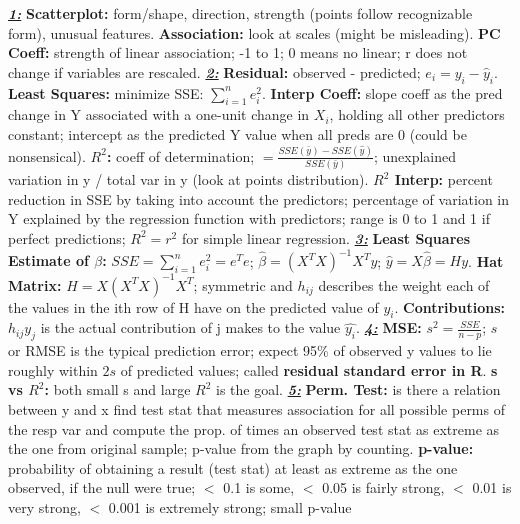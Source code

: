 \documentclass[8pt]{extarticle}
\begin{document}

\textit{\textbf{\underline{1:}}}
\textbf{Scatterplot:} form/shape, direction, strength (points follow 
recognizable form), unusual features.
\textbf{Association:} look at scales (might be misleading).
\textbf{PC Coeff:} strength of linear association; -1 to 1; 0 means no linear; r
does not change if variables are rescaled.
\textit{\textbf{\underline{2:}}}
\textbf{Residual:} observed - predicted; $e_i = y_i - \hat{y}_i$.
\textbf{Least Squares:} minimize SSE: $\sum_{i=1}^{n} e_i^2$.
\textbf{Interp Coeff:} slope coeff as the pred change in Y associated with a 
one-unit change in $X_i$, holding all other predictors constant; intercept as the 
predicted Y value when all preds are 0 (could be nonsensical).
\textbf{$R^2$:} coeff of determination; $ = \frac{SSE(\bar{y}) - SSE(\hat{y})}{SSE(\bar{y})}$;
unexplained variation in y / total var in y (look at points distribution).
\textbf{$R^2$ Interp:} percent reduction in SSE by taking into
account the predictors; percentage of variation in Y explained by the regression 
function with predictors; range is 0 to 1 and 1 if perfect predictions; $R^2 = r^2$
for simple linear regression.
\textit{\textbf{\underline{3:}}}
\textbf{Least Squares Estimate of $\beta$:} $SSE = \sum_{i=1}^{n} e^2_i = e^Te$;
$\hat{\beta} = (X^TX)^{-1}X^Ty$; $\hat{y} = X\hat{\beta} = Hy$.
\textbf{Hat Matrix:} $H = X(X^TX)^{-1}X^T$; symmetric and $h_{ij}$ describes 
the weight each of the values in the ith row of H have on the predicted value 
of $y_i$.
\textbf{Contributions:} $h_{ij}y_j$ is the actual contribution of j makes to the 
value $\hat{y_i}$.
\textit{\textbf{\underline{4:}}}
\textbf{MSE:} $s^2 = \frac{SSE}{n - p}$; $s$ or RMSE is the typical prediction 
error; expect 95\% of observed y values to lie roughly within $2s$ of predicted 
values; called \textbf{residual standard error in R}.
\textbf{s vs $R^2$:} both small s and large $R^2$ is the goal.
\textit{\textbf{\underline{5:}}}
\textbf{Perm. Test:} is there a relation between y and x find test stat that 
measures association for all possible perms of the resp var and compute the prop.
of times an observed test stat as extreme as the one from original sample; p-value 
from the graph by counting.
\textbf{p-value:} probability of obtaining a result (test stat) at least as extreme 
as the one observed, if the null were true; $<$ 0.1 is some, $<$ 0.05 is fairly 
strong, $<$ 0.01 is very strong, $<$ 0.001 is extremely strong; small p-value 
\end{document}
